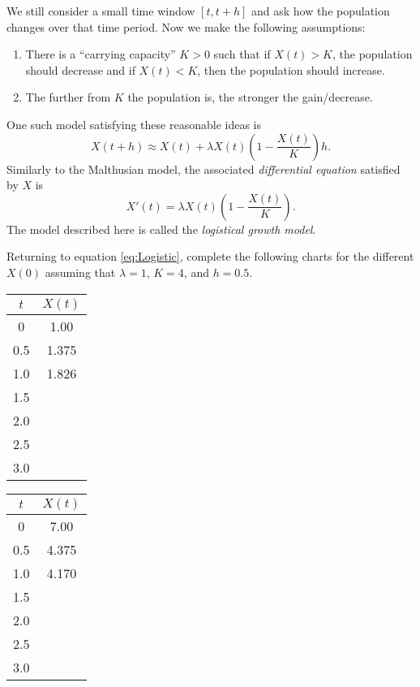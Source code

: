 We still consider a small time window $[t,t+h]$ and ask how the
population changes over that time period.  Now we make the following
assumptions:
\begin{enumerate}
\item There is a ``carrying capacity'' $K>0$ such that if $X(t) > K$,
  the population should decrease and if $X(t) < K$, then the
  population should increase.
\item The further from $K$ the population is, the stronger the
  gain/decrease.
\end{enumerate}

One such model satisfying these reasonable ideas is
\begin{equation}\label{eq:Logistic}
  X(t + h) \approx X(t) + \lambda X(t)\left(1 - \frac{X(t)}{K}\right) h.
\end{equation}
Similarly to the Malthusian model, the associated {\em differential
equation} satisfied by $X$ is
\begin{equation}\label{eq:logistic_ode}
  X'(t) = \lambda X(t) \left(1 - \frac{X(t)}{K}\right).
\end{equation}
The model described here is called the {\em logistical growth
model}.

Returning to equation \eqref{eq:Logistic}, complete the following
charts for the different $X(0)$ assuming that $\lambda = 1$, $K = 4$,
and $h = 0.5$.

\begin{center}
  \begin{tabular}{|c|c|}
    \hline
    $t$ & $X(t)$\\ \hline
    0 & 1.00   \\ \hline
    0.5 & 1.375   \\ \hline
    1.0 & 1.826  \\ \hline
    1.5 &\\ \hline
    2.0 & \\ \hline
    2.5 & \\ \hline
    3.0 & \\ \hline
  \end{tabular}\qquad 
  \begin{tabular}{|c|c|}
    \hline
    $t$ & $X(t)$\\ \hline
    0 & 7.00  \\ \hline
    0.5 & 4.375  \\ \hline
    1.0 & 4.170 \\ \hline
    1.5 &\\ \hline
    2.0 & \\ \hline
    2.5 & \\ \hline
    3.0 & \\ \hline
  \end{tabular}
\end{center}

